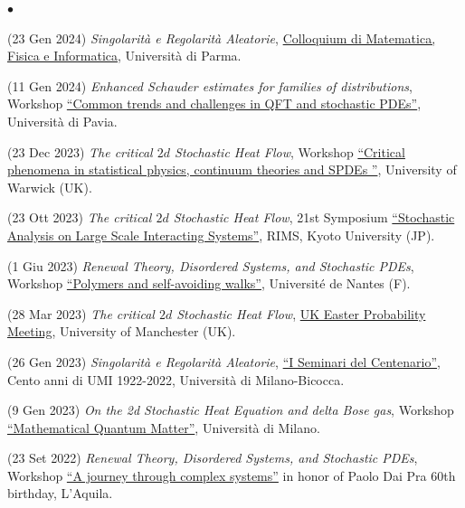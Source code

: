 \documentclass[a4paper,11pt,oneside]{amsart}
\newenvironment{myitemize}{%
\begin{list}{$\bullet$}%
 	{%
	\setlength{\itemsep}{0.3em}%
	\setlength{\topsep}{0.3em}%
	\setlength{\partopsep}{0em}%
	\setlength{\parsep}{0em}%
	\setlength{\parskip}{0em}%
	\setlength\leftmargin{1.5em}%
	\setlength\labelwidth{1.1em}%
	\setlength{\labelsep}{0.4em}%
	}%
	}%
{\end{list}}
\renewenvironment{itemize}{
\begin{myitemize}}%
{\end{myitemize}}
\begin{document}
\begin{itemize}
\item (23 Gen 2024)
\emph{Singolarità e Regolarità Aleatorie},
\href{https://www.unipr.it/node/104243}{Colloquium di Matematica, Fisica e Informatica},
Università di Parma.

\item (11 Gen 2024)
\emph{Enhanced Schauder estimates for families of distributions},
Workshop \href{https://sites.google.com/view/spdesqft/home}{``Common trends and challenges in QFT and stochastic PDEs''},
Università di Pavia.

\item (23 Dec 2023)
\emph{The critical $2d$ Stochastic Heat Flow},
Workshop \href{https://warwick.ac.uk/fac/sci/statistics/news/criticality_workshop}{``Critical phenomena 
in statistical physics, continuum theories and SPDEs ''},
University of Warwick (UK).

\item (23 Ott 2023)
\emph{The critical $2d$ Stochastic Heat Flow},
21st Symposium \href{https://sites.google.com/view/workshop-salsis/home/2023}{``Stochastic 
Analysis on Large Scale Interacting Systems''},
RIMS, Kyoto University (JP).

\item (1 Giu 2023)
\emph{Renewal Theory, Disordered Systems, and Stochastic PDEs},
Workshop \href{https://www.lebesgue.fr/en/polywalks/programme}{``Polymers and self-avoiding walks''},
Université de Nantes (F).

\item (28 Mar 2023)
\emph{The critical $2d$ Stochastic Heat Flow},
\href{https://personalpages.manchester.ac.uk/staff/xiong.jin/easter23/index.html}{UK Easter 
Probability Meeting}, University of Manchester (UK).

\item (26 Gen 2023)
\emph{Singolarità e Regolarità Aleatorie},
\href{https://umi.dm.unibo.it/milano26gennaio23/}{``I Seminari del Centenario''}, 
Cento anni di UMI 1922-2022, 
 Università di Milano-Bicocca.

\item (9 Gen 2023)
\emph{On the 2d Stochastic Heat Equation and delta Bose gas},
Workshop \href{https://sites.google.com/view/mqm-workshop-2023/}{``Mathematical Quantum Matter''}, 
Università di Milano.

\item (23 Set 2022)
\emph{Renewal Theory, Disordered Systems, and Stochastic PDEs},
Workshop  \href{https://sites.google.com/view/pdp60laquila/}{``A journey through complex systems''}
in honor of Paolo Dai Pra 60th birthday, L'Aquila.


\end{itemize}
\end{document}
